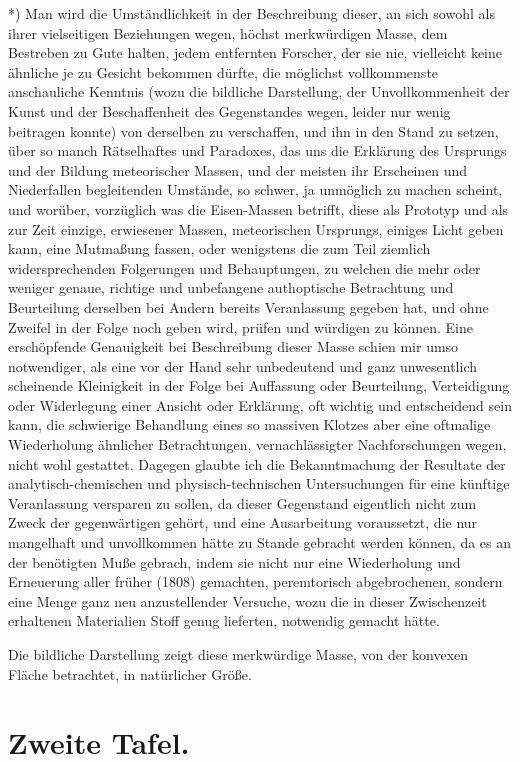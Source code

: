 \documentclass[a4paper, 11pt, oneside, german]{article}
\begin{document}
*) Man wird die Umständlichkeit in der Beschreibung dieser, an sich sowohl als ihrer vielseitigen Beziehungen wegen, höchst merkwürdigen Masse, dem Bestreben zu Gute halten, jedem entfernten Forscher, der sie nie, vielleicht keine ähnliche je zu Gesicht bekommen dürfte, die möglichst vollkommenste anschauliche Kenntnis (wozu die bildliche Darstellung, der Unvollkommenheit der Kunst und der Beschaffenheit des Gegenstandes wegen, leider nur wenig beitragen konnte) von derselben zu verschaffen, und ihn in den Stand zu setzen, über so manch Rätselhaftes und Paradoxes, das uns die Erklärung des Ursprungs und der Bildung meteorischer Massen, und der meisten ihr Erscheinen und Niederfallen begleitenden Umstände, so schwer, ja unmöglich zu machen scheint, und worüber, vorzüglich was die Eisen-Massen betrifft, diese als Prototyp und als zur Zeit einzige, erwiesener Massen, meteorischen Ursprungs, einiges Licht geben kann, eine Mutmaßung fassen, oder wenigstens die zum Teil ziemlich widersprechenden Folgerungen und Behauptungen, zu welchen die mehr oder weniger genaue, richtige und unbefangene authoptische Betrachtung und Beurteilung derselben bei Andern bereits Veranlassung gegeben hat, und ohne Zweifel in der Folge noch geben wird, prüfen und würdigen zu können. Eine erschöpfende Genauigkeit bei Beschreibung dieser Masse schien mir umso notwendiger, als eine vor der Hand sehr unbedeutend und ganz unwesentlich scheinende Kleinigkeit in der Folge bei Auffassung oder Beurteilung, Verteidigung oder Widerlegung einer Ansicht oder Erklärung, oft wichtig und entscheidend sein kann, die schwierige Behandlung eines so massiven Klotzes aber eine oftmalige Wiederholung ähnlicher Betrachtungen, vernachlässigter Nachforschungen wegen, nicht wohl gestattet. Dagegen glaubte ich die Bekanntmachung der Resultate der analytisch-chemischen und physisch-technischen Untersuchungen für eine künftige Veranlassung versparen zu sollen, da dieser Gegenstand eigentlich nicht zum Zweck der gegenwärtigen gehört, und eine Ausarbeitung voraussetzt, die nur mangelhaft und unvollkommen hätte zu Stande gebracht werden können, da es an der benötigten Muße gebrach, indem sie nicht nur eine Wiederholung und Erneuerung aller früher (1808) gemachten, peremtorisch abgebrochenen, sondern eine Menge ganz neu anzustellender Versuche, wozu die in dieser Zwischenzeit erhaltenen Materialien Stoff genug lieferten, notwendig gemacht hätte.

Die bildliche Darstellung zeigt diese merkwürdige Masse, von der konvexen Fläche betrachtet, in natürlicher Größe.
\clearpage
\section{Zweite Tafel.}
\end{document}
